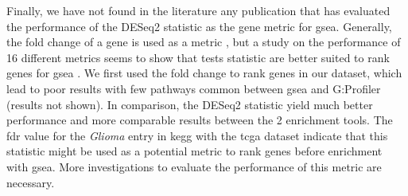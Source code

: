 Finally, we have not found in the literature any publication that has evaluated the performance of the DESeq2 statistic as the gene metric for \acrshort{gsea}.
Generally, the fold change of a gene is used as a metric \cite*{Reimand2019}, but a study on the performance of 16 different metrics seems to show that tests statistic are better suited to rank genes for \acrshort{gsea} \cite*{Zyla2017}.
We first used the fold change to rank genes in our dataset, which lead to poor results with few pathways common between \acrshort{gsea} and G:Profiler (results not shown).
In comparison, the DESeq2 statistic yield much better performance and more comparable results between the 2 enrichment tools.
The \acrshort{fdr} value for the \textit{Glioma} entry in \acrshort{kegg} with the \acrshort{tcga} dataset indicate that this statistic might be used as a potential metric to rank genes before enrichment with \acrshort{gsea}.
More investigations to evaluate the performance of this metric are necessary.